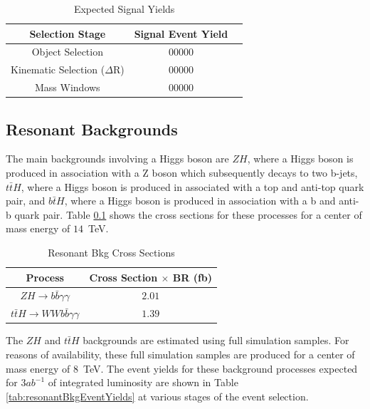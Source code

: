 \documentclass{cmspaper}
\begin{document}
\begin{table}[!ht]
\begin{center} 
\begin{tabular}{|c|c|c|}
\hline
Selection Stage       &  Signal Event Yield &  \\  \hline
Object Selection                &  00000       \\ 
Kinematic Selection ($\Delta$R) &  00000       \\ 
Mass Windows                    &  00000       \\ \hline

\end{tabular}
\caption{Expected Signal Yields }
\label{tab:signalEventYields}
\end{center}
\end{table}

\subsection{Resonant Backgrounds}
The main backgrounds involving a Higgs boson are $ZH$, where a Higgs boson is produced in association
with a Z boson which subsequently decays to two b-jets, $t\bar{t}H$, where a Higgs boson is produced
in associated with a top and anti-top quark pair, and $b\bar{t}H$, where a Higgs boson is produced in
association with a b and anti-b quark pair. Table \ref{} shows the cross sections for these processes
for a center of mass energy of $14$~TeV.


\begin{table}[!ht]
\begin{center} 
\begin{tabular}{|c|c|}
\hline
Process                                           &   Cross Section $\times$ BR (fb)   \\  \hline
$ZH \rightarrow b\bar{b}\gamma\gamma$             &   $2.01$                           \\\hline
$t\bar{t}H \rightarrow W W b \bar{b}\gamma\gamma$ &   $1.39$                           \\\hline

\end{tabular}
\caption{Resonant Bkg Cross Sections }
\label{tab:ResonantBkgCrossSections}
\end{center}
\end{table}

The $ZH$ and $t\bar{t}H$ backgrounds are estimated using full simulation samples. For reasons of 
availability, these full simulation samples are produced for a center of mass energy of $8$~TeV.
The event yields for these background processes expected for $3 ab^{-1}$ of integrated luminosity
are shown in Table \ref{tab:resonantBkgEventYields} at various stages of the event selection.
\end{document}
